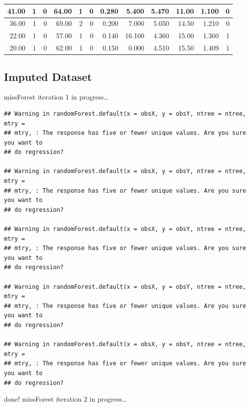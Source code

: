 \documentclass[
]{article}
\begin{document}
\begin{table}
\begin{tabular}[t]{r|r|r|r|r|r|r|r|r|r|r|r}
\hline
41.00 & 1 & 0 & 64.00 & 1 & 0 & 0.280 & 5.400 & 5.470 & 11.00 & 1.100 & 0\\
\hline
36.00 & 1 & 0 & 69.00 & 2 & 0 & 0.200 & 7.000 & 5.050 & 14.50 & 1.210 & 0\\
\hline
22.00 & 1 & 0 & 57.00 & 1 & 0 & 0.140 & 16.100 & 4.360 & 15.00 & 1.360 & 1\\
\hline
20.00 & 1 & 0 & 62.00 & 1 & 0 & 0.150 & 0.000 & 4.510 & 15.50 & 1.409 & 1\\
\hline
\end{tabular}
\end{table}

\hypertarget{imputed-dataset}{%
\subsection{Imputed Dataset}\label{imputed-dataset}}

missForest iteration 1 in progress\ldots{}

\begin{verbatim}
## Warning in randomForest.default(x = obsX, y = obsY, ntree = ntree, mtry =
## mtry, : The response has five or fewer unique values. Are you sure you want to
## do regression?

## Warning in randomForest.default(x = obsX, y = obsY, ntree = ntree, mtry =
## mtry, : The response has five or fewer unique values. Are you sure you want to
## do regression?

## Warning in randomForest.default(x = obsX, y = obsY, ntree = ntree, mtry =
## mtry, : The response has five or fewer unique values. Are you sure you want to
## do regression?

## Warning in randomForest.default(x = obsX, y = obsY, ntree = ntree, mtry =
## mtry, : The response has five or fewer unique values. Are you sure you want to
## do regression?

## Warning in randomForest.default(x = obsX, y = obsY, ntree = ntree, mtry =
## mtry, : The response has five or fewer unique values. Are you sure you want to
## do regression?
\end{verbatim}

done! missForest iteration 2 in progress\ldots{}
\end{document}
